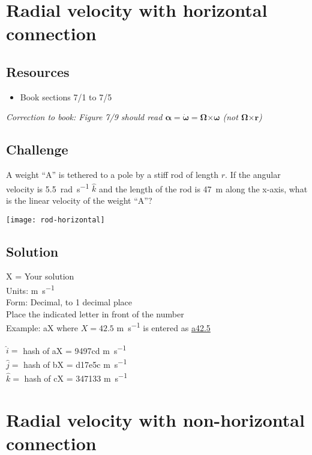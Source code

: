\newpage
\section{Radial velocity with horizontal connection}

\subsection*{Resources}
\begin{itemize}
    \item Book sections 7/1 to 7/5
\end{itemize}

\emph{Correction to book: Figure 7/9 should read $\bm{\alpha} = \bm{\dot{\omega}} = \bm{\Omega} \bm{\times} \bm{\omega}$ (not $\bm{\Omega} \bm{\times} \bm{r}$)}

\subsection*{Challenge}
A weight ``A'' is tethered to a pole by a stiff rod of length $r$. If the angular velocity is \SI{5.5}{\radian\per\second} $\hat{k}$ and the length of the rod is \SI{47}{\meter} along the x-axis, what is the linear velocity of the weight ``A''?

\texttt{[image: rod-horizontal]}

\subsection*{Solution}
X = Your solution\\
Units: \si{\meter\per\second}\\
Form: Decimal, to 1 decimal place\\
Place the indicated letter in front of the number\\
Example: aX where $X=42.5$ \si{\meter\per\second} is entered as \href{http://www.wolframalpha.com/input/?i=md5+hash+of+\%22a42.5\%22}{a42.5}

$\hat{i}=$ hash of aX = 9497cd \si{\meter\per\second}\\
$\hat{j}=$ hash of bX = d17e5c \si{\meter\per\second}\\
$\hat{k}=$ hash of cX = 347133 \si{\meter\per\second}




\newpage
\section{Radial velocity with non-horizontal connection}

